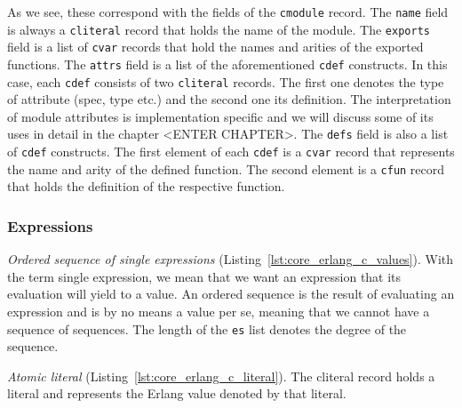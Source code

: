 As we see, these correspond with the fields of the \texttt{c\textunderscore module} record. The \texttt{name}
field is always a \texttt{c\textunderscore literal} record that holds the name of the module. The
\texttt{exports} field is a list of \texttt{c\textunderscore var} records that hold the names and arities of the
exported functions. The \texttt{attrs} field is a list of the aforementioned
\texttt{c\textunderscore def} constructs. In this case, each \texttt{c\textunderscore def} consists of two
\texttt{c\textunderscore literal} records. The first one denotes the type of
attribute (spec, type etc.) and the second one
its definition. The interpretation of module attributes is implementation
specific and we will discuss some of its uses in detail in the chapter <ENTER CHAPTER>. The
\texttt{defs} field is also a list of \texttt{c\textunderscore def} constructs. The
first element of each \texttt{c\textunderscore def} is a \texttt{c\textunderscore var} record
that represents the name and arity of the defined function. The second element
is a \texttt{c\textunderscore fun} record that holds the definition of the respective
function.

\subsubsection{Expressions}


\emph{Ordered sequence of single expressions} (Listing~\ref{lst:core_erlang_c_values}).
With the term single expression, we mean that we want an expression that its
evaluation will yield to a value. An ordered sequence is the result of
evaluating an expression and is by no means a value per se, meaning that we
cannot have a sequence of sequences. The length of the \texttt{es} list denotes the
degree of the sequence.


\emph{Atomic literal} (Listing~\ref{lst:core_erlang_c_literal}).
The c\textunderscore literal record holds a  literal and represents the Erlang value denoted
by that literal.



